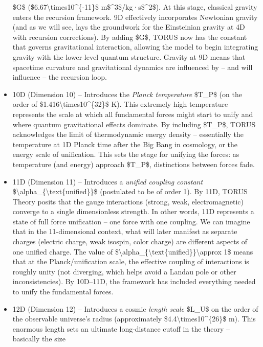 \documentclass[]{article}
\begin{document}
\begin{itemize}
  \$G\$ (\$6.67\textbackslash{}times10\^{}\{-11\}\$
  m\$\^{}3\$/kg·s\$\^{}2\$). At this stage, classical gravity enters the
  recursion framework. 9D effectively incorporates Newtonian gravity
  (and as we will see, lays the groundwork for the Einsteinian gravity
  at 4D with recursion corrections). By adding \$G\$, TORUS now has the
  constant that governs gravitational interaction, allowing the model to
  begin integrating gravity with the lower-level quantum structure.
  Gravity at 9D means that spacetime curvature and gravitational
  dynamics are influenced by -- and will influence -- the recursion
  loop.
\item
  10D (Dimension 10) -- Introduces the \emph{Planck temperature}
  \$T\_P\$ (on the order of \$1.416\textbackslash{}times10\^{}\{32\}\$
  K). This extremely high temperature represents the scale at which all
  fundamental forces might start to unify and where quantum
  gravitational effects dominate. By including \$T\_P\$, TORUS
  acknowledges the limit of thermodynamic energy density -- essentially
  the temperature at 1D Planck time after the Big Bang in cosmology, or
  the energy scale of unification. This sets the stage for unifying the
  forces: as temperature (and energy) approach \$T\_P\$, distinctions
  between forces fade.
\item
  11D (Dimension 11) -- Introduces a \emph{unified coupling constant}
  \$\textbackslash{}alpha\_\{\textbackslash{}text\{unified\}\}\$
  (postulated to be of order 1). By 11D, TORUS Theory posits that the
  gauge interactions (strong, weak, electromagnetic) converge to a
  single dimensionless strength. In other words, 11D represents a state
  of full force unification -- one force with one coupling. We can
  imagine that in the 11-dimensional context, what will later manifest
  as separate charges (electric charge, weak isospin, color charge) are
  different aspects of one unified charge. The value of
  \$\textbackslash{}alpha\_\{\textbackslash{}text\{unified\}\}\textbackslash{}approx
  1\$ means that at the Planck/uniﬁcation scale, the effective coupling
  of interactions is roughly unity (not diverging, which helps avoid a
  Landau pole or other inconsistencies). By 10D--11D, the framework has
  included everything needed to unify the fundamental forces.
\item
  12D (Dimension 12) -- Introduces a cosmic \emph{length scale} \$L\_U\$
  on the order of the observable universe's radius (approximately
  \$4.4\textbackslash{}times10\^{}\{26\}\$ m). This enormous length sets
  an ultimate long-distance cutoff in the theory -- basically the size

\end{itemize}
\end{document}
